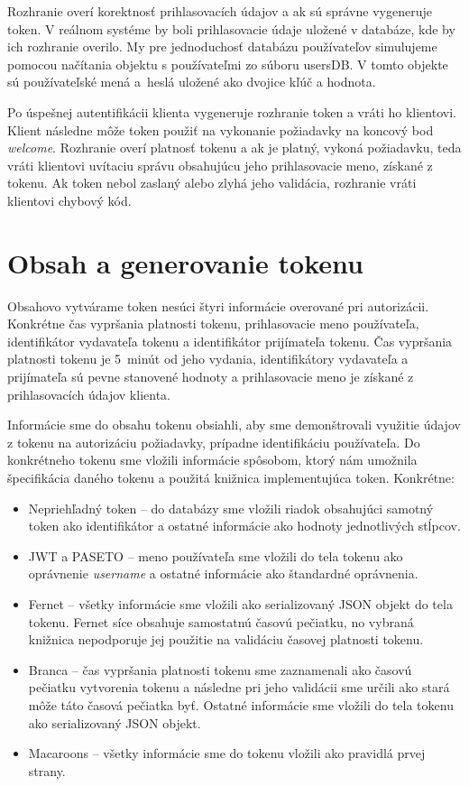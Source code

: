 Rozhranie overí korektnosť prihlasovacích údajov a ak sú správne vygeneruje token. V reálnom systéme by boli prihlasovacie údaje uložené v databáze, kde by ich rozhranie overilo. My pre jednoduchosť databázu používateľov simulujeme pomocou načítania objektu s používateľmi zo súboru usersDB. V tomto objekte sú používateľské mená a~heslá uložené ako dvojice kľúč a hodnota.

Po úspešnej autentifikácii klienta vygeneruje rozhranie token a vráti ho klientovi. Klient následne môže token použiť na vykonanie požiadavky na koncový bod \textit{welcome}. Rozhranie overí platnosť tokenu a ak je platný, vykoná požiadavku, teda vráti klientovi uvítaciu správu obsahujúcu jeho prihlasovacie meno, získané z tokenu. Ak token nebol zaslaný alebo zlyhá jeho validácia, rozhranie vráti klientovi chybový kód.

\section{Obsah a generovanie tokenu}
\label{sec:obsah}

Obsahovo vytvárame token nesúci štyri informácie overované pri autorizácii. Konkrétne čas vypršania platnosti tokenu, prihlasovacie meno používateľa, identifikátor vydavateľa tokenu a identifikátor prijímateľa tokenu. Čas vypršania platnosti tokenu je 5~minút od jeho vydania, identifikátory vydavateľa a prijímateľa sú pevne stanovené hodnoty a prihlasovacie meno je získané z prihlasovacích údajov klienta.

Informácie sme do obsahu tokenu obsiahli, aby sme demonštrovali využitie údajov z tokenu na autorizáciu požiadavky, prípadne identifikáciu používateľa. Do konkrétneho tokenu sme vložili informácie spôsobom, ktorý nám umožnila špecifikácia daného tokenu a použitá knižnica implementujúca token. Konkrétne:


\begin{itemize}
    \item Nepriehľadný token -- do databázy sme vložili riadok obsahujúci samotný token ako identifikátor a ostatné informácie ako hodnoty jednotlivých stĺpcov.
    \item JWT a PASETO -- meno používateľa sme vložili do tela tokenu ako oprávnenie \textit{username} a ostatné informácie ako štandardné oprávnenia.
    \item Fernet -- všetky informácie sme vložili ako serializovaný JSON objekt do tela tokenu. Fernet síce obsahuje samostatnú časovú pečiatku, no vybraná knižnica nepodporuje jej použitie na validáciu časovej platnosti tokenu.
    \item Branca -- čas vypršania platnosti tokenu sme zaznamenali ako časovú pečiatku vytvorenia tokenu a následne pri jeho validácii sme určili ako stará môže táto časová pečiatka byť. Ostatné informácie sme vložili do tela tokenu ako serializovaný JSON objekt.
    \item Macaroons -- všetky informácie sme do tokenu vložili ako pravidlá prvej strany.
\end{itemize}

